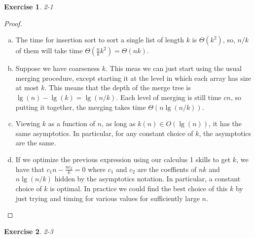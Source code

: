 \documentclass{article}
\newtheorem{th1}{Exercise}
\begin{document}
\begin{th1}\label{ex9}
2-1
\end{th1}
\begin{proof}
\begin{enumerate}[a)]
\item
The time for insertion sort to sort a single list of length $k$ is $\Theta(k^2)$, so, $n/k$ of them will take time $\Theta(\frac{n}{k}k^2) = \Theta(nk)$.

\item
Suppose we have coarseness $k$. This meas we can just start using the usual merging procedure, except starting it at the level in which each array has size at most $k$. This means that the depth of the merge tree is $\lg(n) - \lg(k) = \lg(n/k)$. Each level of merging is still time $cn$, so putting it together, the merging takes time $\Theta(n\lg(n/k))$.


\item
Viewing $k$ as a function of $n$, as long as $k(n)\in O(\lg(n))$, it has the same asymptotics. In particular, for any constant choice of $k$, the asymptotics are the same.

\item
If we optimize the previous expression using our calculus 1 skills to get $k$, we have that $c_1n- \frac{nc_2}{k} = 0$ where $c_1$ and $c_2$ are the coeffients of $nk$ and $n\lg(n/k)$ hidden by the asymptotics notation. In particular, a constant choice of $k$ is optimal. In practice we could find the best choice of this $k$ by just trying and timing  for various values for sufficiently large $n$.

\end{enumerate}
\end{proof}
\begin{th1}\label{ex10}
2-3
\end{th1}
\end{document}
